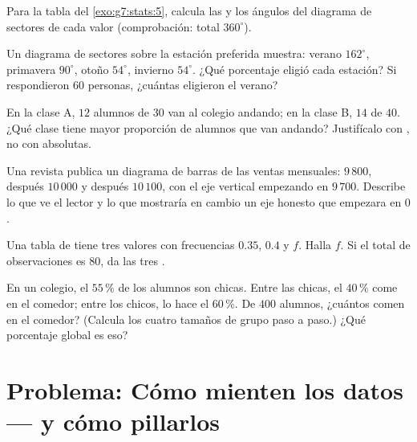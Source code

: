 \begin{exercise}[$\star$]\label{exo:g7:stats:6}
Para la tabla del \cref{exo:g7:stats:5}, calcula las  y
los ángulos del diagrama de sectores de cada valor (comprobación: total $360^\circ$).
\end{exercise}

\begin{exercise}[$\star$]\label{exo:g7:stats:7}
Un diagrama de sectores sobre la estación preferida muestra: verano $162^\circ$, primavera
$90^\circ$, otoño $54^\circ$, invierno $54^\circ$. ¿Qué porcentaje
eligió cada estación? Si respondieron $60$ personas, ¿cuántas eligieron el verano?
\end{exercise}

\begin{exercise}[$\star\star$]\label{exo:g7:stats:8}
En la clase A, $12$ alumnos de $30$ van al colegio andando; en la clase B,
$14$ de $40$. ¿Qué clase tiene mayor proporción de alumnos que van andando?
Justifícalo con , no con absolutas.
\end{exercise}

\begin{exercise}[$\star\star$]\label{exo:g7:stats:9}
Una revista publica un diagrama de barras de las ventas mensuales: $9\,800$, después
$10\,000$ y después $10\,100$, con el eje vertical empezando en
$9\,700$. Describe lo que ve el lector y lo que mostraría en cambio un eje honesto
que empezara en $0$.
\end{exercise}

\begin{exercise}[$\star\star$]\label{exo:g7:stats:10}
Una tabla de  tiene tres valores con frecuencias $0.35$, $0.4$ y
$f$. Halla $f$. Si el total de observaciones es $80$, da las tres .
\end{exercise}

\begin{exercise}[$\star\star\star$]\label{exo:g7:stats:11}
En un colegio, el $55\,\%$ de los alumnos son chicas. Entre las chicas, el
$40\,\%$ come en el comedor; entre los chicos, lo hace el $60\,\%$. De
$400$ alumnos, ¿cuántos comen en el comedor? (Calcula los cuatro
tamaños de grupo paso a paso.) ¿Qué porcentaje global es eso?
\end{exercise}

\section{Problema: Cómo mienten los datos --- y cómo pillarlos}

